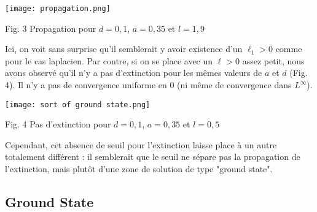 \documentclass{article}
\begin{document}
\begin{center}
\texttt{[image: propagation.png]}

Fig. 3 Propagation pour $d = 0,1$, $a = 0,35$ et $l=1,9$
\end{center}

Ici, on voit sans surprise qu'il semblerait y avoir existence d'un $\ell_1>0$ comme pour le cas laplacien. Par contre, si on se place avec un $\ell>0$ assez petit, nous avons observé qu'il n'y a pas d'extinction pour les mêmes valeurs de $a$ et $d$ (Fig. 4). Il n'y a pas de convergence uniforme en 0 (ni même de convergence dans $L^{\infty}$). 

\begin{center}
\texttt{[image: sort	of ground state.png]}

Fig. 4 Pas d'extinction pour $d = 0,1$, $a = 0,35$ et $l=0,5$
\end{center}

Cependant, cet absence de seuil pour l'extinction laisse place à un autre totalement différent : il semblerait que le seuil ne sépare pas la propagation de l'extinction, mais plutôt d'une zone de solution de type "ground state".


\subsection{Ground State}
\end{document}
